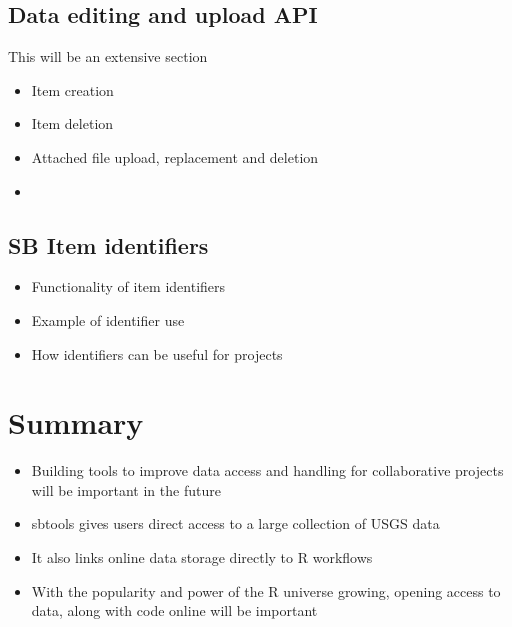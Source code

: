 \subsection{Data editing and upload API}
This will be an extensive section
\begin{itemize}
	\item{Item creation}
	\item{Item deletion}
	\item{Attached file upload, replacement and deletion}
	\item{}
\end{itemize}

\subsection{SB Item identifiers}
\begin{itemize}
	\item{Functionality of item identifiers}
	\item{Example of identifier use}
	\item{How identifiers can be useful for projects}
\end{itemize}

\section{Summary}
\begin{itemize}
	\item{Building tools to improve data access and handling for collaborative projects will be important in the future}
	\item{sbtools gives users direct access to a large collection of USGS data}
	\item{It also links online data storage directly to R workflows}
	\item{With the popularity and power of the R universe growing, opening access to data, along with code online will be important}
\end{itemize}




\address{Luke A Winslow\\
  U.S. Geological Survey Center for Integrated Data Analytics\\
  Middleton, Wisconsin\\
  USA\\}

\address{Scott Chamberlain\\
  Affiliation\\
  Address\\
  Country\\}

